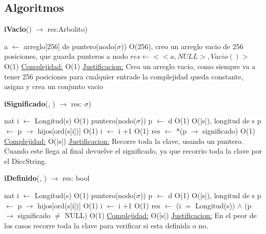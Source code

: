\subsection{Algoritmos}

\begin{Algoritmos}

\begin{algorithm}[H]{\textbf{iVacio}() $\to$ res:Arbolito)}
	\begin{algorithmic}[1]
		\State a $\gets$ arreglo[256] de puntero(nodo($\sigma$)) \Comment O(256), creo un arreglo vacio de 256 posiciones, que guarda punteros a nodo
		\State $res \gets <<a, NULL>, Vacio()>$ \Comment O(1)
		\medskip
		\Statex \underline{Complejidad:} O(1)
			\Statex \underline{Justificacion:} Crea un arreglo vacio, como siempre va a tener 256 posiciones para cualquier entrade la complejidad queda constante, asigna y crea un conjunto vacio
	\end{algorithmic}
\end{algorithm}


\begin{algorithm}[H]{\textbf{iSignificado}(, ) $\to$ res: $\sigma$)}
	\begin{algorithmic}[1]
		\State nat i $\gets$ Longitud(s) \Comment O(1)
		\State puntero(nodo($\sigma$)) p $\gets$ d \Comment O(1)
		 \Comment O(|s|), longitud de s
			\State p $\gets$ p $\to$ hijos[ord(s[i])] \Comment O(1)
		 	\State i $\gets$ i +1 \Comment O(1)
		 \EndWhile
		 \State res $\gets$ *(p $\to$ significado) \Comment O(1)
		\medskip
		\Statex \underline{Complejidad:} O(|s|)
			\Statex \underline{Justificacion:} Recorre toda la clave, usando un puntero. Cuando este llega al final devuelve el significado, ya que recorrio toda la clave por el DiccString.  
	\end{algorithmic}
\end{algorithm}

\begin{algorithm}[H]{\textbf{iDefinido}(, ) $\to$ res: bool}
	\begin{algorithmic}[1]
		\State nat i $\gets$ Longitud(s) \Comment O(1)
		\State puntero(nodo($\sigma$)) p $\gets$ d \Comment O(1)
		 \Comment O(|s|), longitud de s
			\State p $\gets$ p $\to$ hijos[ord(s[i])] \Comment O(1)
		 	\State i $\gets$ i +1 \Comment O(1)
		 \EndWhile
		 \State res $\gets$ (i $=$ Longitud(s)) $\wedge$ (p$\to$ significado $\neq$ NULL) \Comment O(1)
		\medskip
		\Statex \underline{Complejidad:} O(|s|)
			\Statex \underline{Justificacion:} En el peor de los casos recorre toda la clave para verificar si esta definida o no.  
	\end{algorithmic}
\end{algorithm}


\end{Algoritmos}
